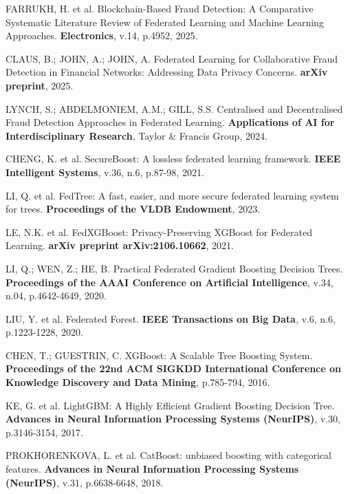 FARRUKH, H. et al.
Blockchain-Based Fraud Detection: A Comparative Systematic Literature Review of Federated Learning and Machine Learning Approaches.
{\bf Electronics},
v.14, p.4952, 2025.

CLAUS, B.; JOHN, A.; JOHN, A.
Federated Learning for Collaborative Fraud Detection in Financial Networks: Addressing Data Privacy Concerns.
{\bf arXiv preprint}, 2025.

LYNCH, S.; ABDELMONIEM, A.M.; GILL, S.S.
Centralised and Decentralised Fraud Detection Approaches in Federated Learning.
{\bf Applications of AI for Interdisciplinary Research},
Taylor \& Francis Group, 2024.


CHENG, K. et al.
SecureBoost: A lossless federated learning framework.
{\bf IEEE Intelligent Systems},
v.36, n.6, p.87-98, 2021.

LI, Q. et al.
FedTree: A fast, easier, and more secure federated learning system for trees.
{\bf Proceedings of the VLDB Endowment}, 2023.

LE, N.K. et al.
FedXGBoost: Privacy-Preserving XGBoost for Federated Learning.
{\bf arXiv preprint arXiv:2106.10662}, 2021.

LI, Q.; WEN, Z.; HE, B.
Practical Federated Gradient Boosting Decision Trees.
{\bf Proceedings of the AAAI Conference on Artificial Intelligence},
v.34, n.04, p.4642-4649, 2020.

LIU, Y. et al.
Federated Forest.
{\bf IEEE Transactions on Big Data},
v.6, n.6, p.1223-1228, 2020.


CHEN, T.; GUESTRIN, C.
XGBoost: A Scalable Tree Boosting System.
{\bf Proceedings of the 22nd ACM SIGKDD International Conference on Knowledge Discovery and Data Mining},
p.785-794, 2016.

KE, G. et al.
LightGBM: A Highly Efficient Gradient Boosting Decision Tree.
{\bf Advances in Neural Information Processing Systems (NeurIPS)},
v.30, p.3146-3154, 2017.

PROKHORENKOVA, L. et al.
CatBoost: unbiased boosting with categorical features.
{\bf Advances in Neural Information Processing Systems (NeurIPS)},
v.31, p.6638-6648, 2018.


